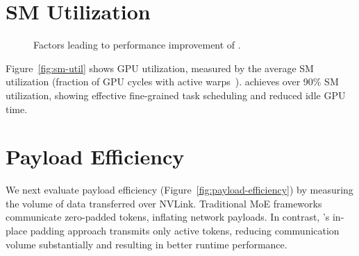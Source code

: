 \section{SM Utilization}\label{sec:sm-utilization}
\begin{figure}[!ht]
    \centering
    \hspace{2pt}
    \caption{Factors leading to performance improvement of \sysname.}
    \label{fig:sm-util-payload-efficiency}
\end{figure}
Figure~\ref{fig:sm-util} shows GPU utilization,
measured by the average SM utilization (fraction of GPU cycles with active warps~\cite{nsight-metrics}).
\sysname achieves over 90\% SM utilization, showing effective fine-grained task scheduling and reduced idle GPU time.
\section{Payload Efficiency}\label{sec:payload-efficiency}
We next evaluate payload efficiency (Figure~\ref{fig:payload-efficiency})
by measuring the volume of data transferred over NVLink.
Traditional MoE frameworks communicate zero-padded tokens,
inflating network payloads.
In contrast, \sysname's in-place padding approach transmits only active tokens,
reducing communication volume substantially and resulting in better runtime performance.
